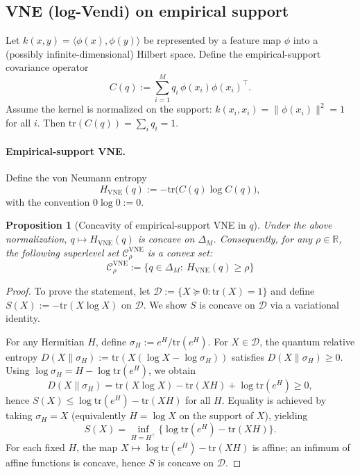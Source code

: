 \documentclass{article}
\newtheorem{proposition}{Proposition}
\theoremstyle{plain}
\theoremstyle{definition}
\begin{document}
\begin{appendices}
\subsection{VNE (log-Vendi) on empirical support}

Let $k(x,y)=\langle\phi(x),\phi(y)\rangle$ be represented by a feature map $\phi$ into a (possibly infinite-dimensional) Hilbert space. Define the empirical-support covariance operator
\begin{equation}\label{eq:app_cov_op}
C(q):=\sum_{i=1}^M q_i\,\phi(x_i)\phi(x_i)^\top.
\end{equation}
Assume the kernel is normalized on the support: $k(x_i,x_i)=\|\phi(x_i)\|^2=1$ for all $i$. Then $\mathrm{tr}(C(q))=\sum_i q_i=1$.

\paragraph{Empirical-support VNE.}
Define the von Neumann entropy
\begin{equation}\label{eq:app_vne_def}
H_{\mathrm{VNE}}(q):=-\mathrm{tr}\!\bigl(C(q)\log C(q)\bigr),
\end{equation}
with the convention $0\log 0:=0$.

\begin{proposition}[Concavity of empirical-support VNE in $q$]\label{prop:app_vne_concavity}
Under the above normalization, $q\mapsto H_{\mathrm{VNE}}(q)$ is concave on $\Delta_M$. Consequently, for any $\rho\in\mathbb{R}$, the following superlevel set $\mathcal{C}^{\mathrm{VNE}}_\rho$ is a convex set:
\[
\mathcal{C}^{\mathrm{VNE}}_\rho := \{q\in\Delta_M:\ H_{\mathrm{VNE}}(q)\ge \rho\}
\]
\end{proposition}
\begin{proof}
To prove the statement, let $\mathcal{D}:=\{X\succeq 0:\mathrm{tr}(X)=1\}$ and define $S(X):=-\mathrm{tr}(X\log X)$ on $\mathcal{D}$.
We show $S$ is concave on $\mathcal{D}$ via a variational identity.

For any Hermitian $H$, define $\sigma_H := e^{H}/\mathrm{tr}(e^{H})$. For $X\in\mathcal{D}$, the quantum relative entropy
$D(X\|\sigma_H):=\mathrm{tr}(X(\log X-\log\sigma_H))$ satisfies $D(X\|\sigma_H)\ge 0$.
Using $\log\sigma_H = H - \log\mathrm{tr}(e^{H})$, we obtain
\[
D(X\|\sigma_H)=\mathrm{tr}(X\log X)-\mathrm{tr}(XH)+\log\mathrm{tr}(e^{H})\ge 0,
\]
hence $S(X)\le \log\mathrm{tr}(e^{H})-\mathrm{tr}(XH)$ for all $H$. Equality is achieved by taking $\sigma_H=X$
(equivalently $H=\log X$ on the support of $X$), yielding
\[
S(X)=\inf_{H=H^\top}\bigl\{\log\mathrm{tr}(e^{H})-\mathrm{tr}(XH)\bigr\}.
\]
For each fixed $H$, the map $X\mapsto \log\mathrm{tr}(e^{H})-\mathrm{tr}(XH)$ is affine; an infimum of affine functions is concave, hence $S$ is concave on $\mathcal{D}$.


\end{proof}
\end{appendices}
\end{document}
